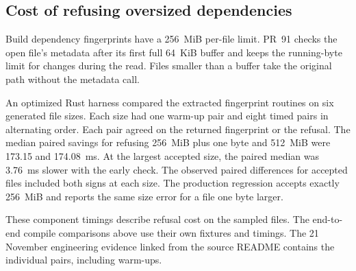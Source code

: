 \subsection{Cost of refusing oversized dependencies}

Build dependency fingerprints have a 256~MiB per-file limit. PR~91
checks the open file's metadata after its first full 64~KiB buffer and
keeps the running-byte limit for changes during the read. Files smaller
than a buffer take the original path without the metadata call.

An optimized Rust harness compared the extracted fingerprint routines on
six generated file sizes. Each size had one warm-up pair and eight timed
pairs in alternating order. Each pair agreed on the returned fingerprint
or the refusal. The median paired savings for refusing 256~MiB plus one
byte and 512~MiB were 173.15 and 174.08~ms. At the largest accepted size,
the paired median was 3.76~ms slower with the early check. The observed
paired differences for accepted files included both signs at each size.
The production regression accepts exactly 256~MiB and reports the same
size error for a file one byte larger.

These component timings describe refusal cost on the sampled files. The
end-to-end compile comparisons above use their own fixtures and timings.
The 21 November engineering evidence linked from the source README
contains the individual pairs, including warm-ups.
